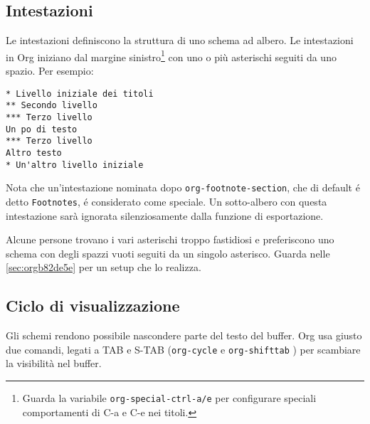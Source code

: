 \documentclass[11pt]{article}
\begin{document}
\subsection{Intestazioni}
\label{sec:orgd91538d}
Le intestazioni definiscono la struttura di uno schema ad albero. Le
intestazioni in Org iniziano dal margine sinistro\footnote{Guarda la variabile \texttt{org-special-ctrl-a/e} per configurare
speciali comportamenti di C-a e C-e nei titoli.} con uno o più
asterischi seguiti da uno spazio. Per esempio:

\begin{verbatim}
* Livello iniziale dei titoli
** Secondo livello
*** Terzo livello
Un po di testo
*** Terzo livello
Altro testo
* Un'altro livello iniziale
\end{verbatim}

Nota che un'intestazione nominata dopo \texttt{org-footnote-section}, che di
default é detto \texttt{Footnotes}, é considerato come speciale. Un
sotto-albero con questa intestazione sarà ignorata silenziosamente
dalla funzione di esportazione.

Alcune persone trovano i vari asterischi troppo fastidiosi e
preferiscono uno schema con degli spazzi vuoti seguiti da un singolo
asterisco. Guarda nelle \ref{sec:orgb82de5e} per un setup che lo realizza.

\subsection{Ciclo di visualizzazione}
\label{sec:org12e9ab8}
Gli schemi rendono possibile nascondere parte del testo del buffer. Org usa
giusto due comandi, legati a TAB e S-TAB (\texttt{org-cycle} e
\texttt{org-shifttab} ) per scambiare la visibilità nel buffer.
\end{document}
